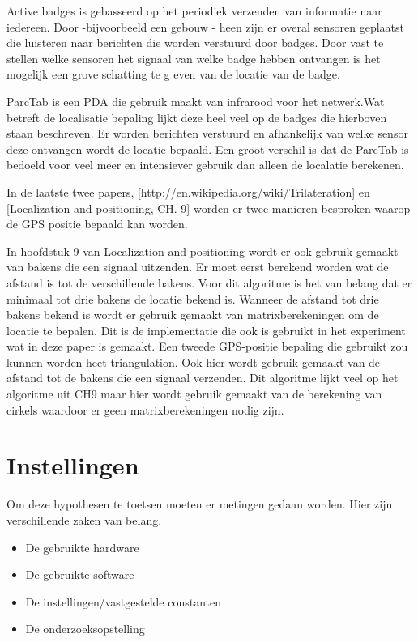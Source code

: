 \documentclass{article}
\begin{document}
Active badges is gebasseerd op het periodiek verzenden van informatie naar iedereen. Door -bijvoorbeeld een gebouw - heen zijn er overal sensoren geplaatst die luisteren naar berichten die worden verstuurd door badges. Door vast te stellen welke sensoren het signaal van welke badge hebben ontvangen is het mogelijk een grove schatting te g
even van de locatie van de badge.
\newline 

ParcTab is een PDA die gebruik maakt van infrarood voor het netwerk.Wat betreft de localisatie bepaling lijkt deze heel veel op de badges die hierboven staan beschreven. Er worden berichten verstuurd en afhankelijk van welke sensor deze ontvangen wordt de locatie bepaald. Een groot verschil is dat de ParcTab is bedoeld voor veel meer en intensiever gebruik dan alleen de localatie berekenen. 

In de laatste twee papers, [http://en.wikipedia.org/wiki/Trilateration] en [Localization and positioning, CH. 9] worden er twee manieren besproken waarop de GPS positie bepaald kan worden. 

In hoofdstuk 9 van Localization and positioning wordt er ook gebruik gemaakt van bakens die een signaal uitzenden. Er moet eerst berekend worden wat de afstand is tot de verschillende bakens. Voor dit algoritme is het van belang dat er minimaal tot drie bakens de locatie bekend is. Wanneer de afstand tot drie bakens bekend is wordt er gebruik gemaakt van matrixberekeningen om de locatie te bepalen. Dit is de implementatie die ook is gebruikt in het experiment wat in deze paper is gemaakt.
\newline
Een tweede GPS-positie bepaling die gebruikt zou kunnen worden heet triangulation. Ook hier wordt gebruik gemaakt van de afstand tot de bakens die een signaal verzenden. Dit algoritme lijkt veel op het algoritme uit CH9 maar hier wordt gebruik gemaakt van de berekening van cirkels waardoor er geen matrixberekeningen nodig zijn. 




\section{Instellingen}
Om deze hypothesen te toetsen moeten er metingen gedaan worden. Hier zijn verschillende zaken van belang. 
\begin{itemize}
	\item De gebruikte hardware
	\item De gebruikte software
	\item De instellingen/vastgestelde constanten
	\item De onderzoeksopstelling
\end{itemize}
\end{document}
